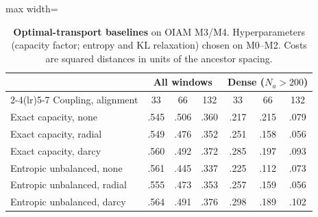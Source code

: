 \begin{table}[t]
\centering\small
\setlength{\tabcolsep}{3pt}
\begin{adjustbox}{max width=\linewidth}
\begin{tabular}{lcccccc}
\toprule
& \multicolumn{3}{c}{All windows} & \multicolumn{3}{c}{Dense ($N_a{>}200$)} \\
\cmidrule(lr){2-4}\cmidrule(lr){5-7}
Coupling, alignment & 33 & 66 & 132 & 33 & 66 & 132 \\
\midrule
Exact capacity, none & .545 & .506 & .360 & .217 & .215 & .079 \\
Exact capacity, radial & .549 & .476 & .352 & .251 & .158 & .056 \\
Exact capacity, darcy & .560 & .492 & .372 & .285 & .197 & .093 \\
Entropic unbalanced, none & .561 & .445 & .337 & .225 & .112 & .073 \\
Entropic unbalanced, radial & .555 & .473 & .353 & .257 & .159 & .056 \\
Entropic unbalanced, darcy & .564 & .491 & .376 & .298 & .189 & .102 \\
\bottomrule
\end{tabular}
\end{adjustbox}
\caption{\textbf{Optimal-transport baselines} on OIAM M3/M4. Hyperparameters (capacity factor; entropy and KL relaxation) chosen on M0--M2. Costs are squared distances in units of the ancestor spacing.}
\label{tab:ot}
\end{table}
